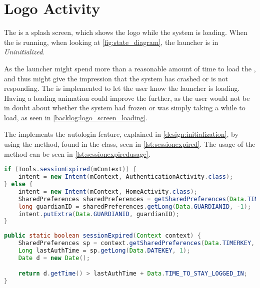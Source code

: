 \section{Logo Activity}
The  is a splash screen, which shows the \giraf[] logo while the system is loading. 
When the  is running, when looking at \autoref{fig:state_diagram}, the launcher is in \emph{Uninitialized}. 

As the launcher might spend more than a reasonable amount of time to load the , and thus might give the impression that the system has crashed or is not responding. 
The  is implemented to let the user know the launcher is loading.
Having a loading animation could improve the  further, as the user would not be in doubt about whether the system had frozen or was simply taking a while to load, as seen in \autoref{backlog:logo_screen_loading}.

The  implements the autologin feature, explained in \autoref{design:initialization}, by using the  method, found in the  class, seen in \autoref{lst:sessionexpired}.
The usage of the  method can be seen in \autoref{lst:sessionexpiredusage}.

\begin{lstlisting}[style=sourceCode, language=JAVA, caption=Snippet of LogoActivity.java, label=lst:sessionexpiredusage] 
if (Tools.sessionExpired(mContext)) {
	intent = new Intent(mContext, AuthenticationActivity.class);
} else {
	intent = new Intent(mContext, HomeActivity.class);
	SharedPreferences sharedPreferences = getSharedPreferences(Data.TIMERKEY, 0);
	long guardianID = sharedPreferences.getLong(Data.GUARDIANID, -1);
	intent.putExtra(Data.GUARDIANID, guardianID);
}
\end{lstlisting}


\begin{lstlisting}[style=sourceCode, language=JAVA, caption=Snippet of Tools.java, label=lst:sessionexpired]
public static boolean sessionExpired(Context context) {
	SharedPreferences sp = context.getSharedPreferences(Data.TIMERKEY, 0);
	Long lastAuthTime = sp.getLong(Data.DATEKEY, 1);
	Date d = new Date();

	return d.getTime() > lastAuthTime + Data.TIME_TO_STAY_LOGGED_IN;
}
\end{lstlisting}
